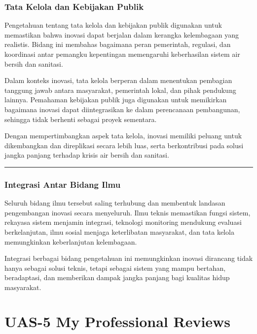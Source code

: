 \documentclass[
  letterpaper,
  DIV=11,
  numbers=noendperiod]{scrreprt}
\begin{document}
\subsection{Tata Kelola dan Kebijakan
Publik}\label{tata-kelola-dan-kebijakan-publik}

Pengetahuan tentang tata kelola dan kebijakan publik digunakan untuk
memastikan bahwa inovasi dapat berjalan dalam kerangka kelembagaan yang
realistis. Bidang ini membahas bagaimana peran pemerintah, regulasi, dan
koordinasi antar pemangku kepentingan memengaruhi keberhasilan sistem
air bersih dan sanitasi.

Dalam konteks inovasi, tata kelola berperan dalam menentukan pembagian
tanggung jawab antara masyarakat, pemerintah lokal, dan pihak pendukung
lainnya. Pemahaman kebijakan publik juga digunakan untuk memikirkan
bagaimana inovasi dapat diintegrasikan ke dalam perencanaan pembangunan,
sehingga tidak berhenti sebagai proyek sementara.

Dengan mempertimbangkan aspek tata kelola, inovasi memiliki peluang
untuk dikembangkan dan direplikasi secara lebih luas, serta
berkontribusi pada solusi jangka panjang terhadap krisis air bersih dan
sanitasi.

\begin{center}\rule{0.5\linewidth}{0.5pt}\end{center}

\subsection{Integrasi Antar Bidang
Ilmu}\label{integrasi-antar-bidang-ilmu}

Seluruh bidang ilmu tersebut saling terhubung dan membentuk landasan
pengembangan inovasi secara menyeluruh. Ilmu teknis memastikan fungsi
sistem, rekayasa sistem menjamin integrasi, teknologi monitoring
mendukung evaluasi berkelanjutan, ilmu sosial menjaga keterlibatan
masyarakat, dan tata kelola memungkinkan keberlanjutan kelembagaan.

Integrasi berbagai bidang pengetahuan ini memungkinkan inovasi dirancang
tidak hanya sebagai solusi teknis, tetapi sebagai sistem yang mampu
bertahan, beradaptasi, dan memberikan dampak jangka panjang bagi
kualitas hidup masyarakat.


\chapter{UAS-5 My Professional
Reviews}\label{uas-5-my-professional-reviews}
\end{document}
